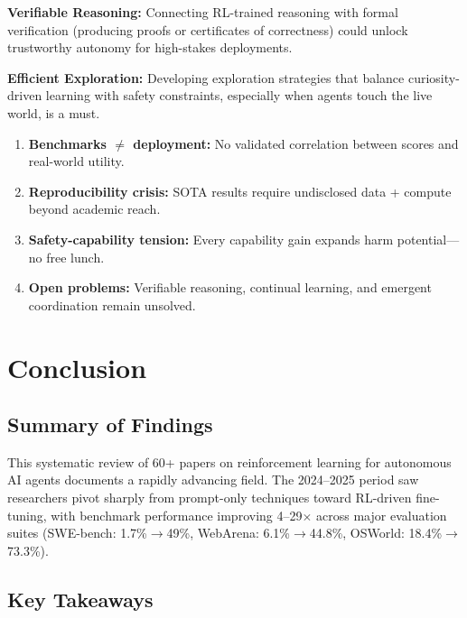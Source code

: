 \documentclass[12pt,a4paper]{report}
\theoremstyle{definition}
\begin{document}
\textbf{Verifiable Reasoning:} Connecting RL-trained reasoning with formal verification (producing proofs or certificates of correctness) could unlock trustworthy autonomy for high-stakes deployments.

\textbf{Efficient Exploration:} Developing exploration strategies that balance curiosity-driven learning with safety constraints, especially when agents touch the live world, is a must.

\begin{tcolorbox}[colback=red!5!white, colframe=red!60!black, title=\textbf{Chapter 6 Key Takeaways}]
\begin{enumerate}
    \item \textbf{Benchmarks $\neq$ deployment:} No validated correlation between scores and real-world utility.
    \item \textbf{Reproducibility crisis:} SOTA results require undisclosed data + compute beyond academic reach.
    \item \textbf{Safety-capability tension:} Every capability gain expands harm potential---no free lunch.
    \item \textbf{Open problems:} Verifiable reasoning, continual learning, and emergent coordination remain unsolved.
\end{enumerate}
\end{tcolorbox}



\chapter{Conclusion}
\label{ch:conclusion}

\section*{Summary of Findings}
This systematic review of 60+ papers on reinforcement learning for autonomous AI agents documents a rapidly advancing field. The 2024--2025 period saw researchers pivot sharply from prompt-only techniques toward RL-driven fine-tuning, with benchmark performance improving 4--29$\times$ across major evaluation suites (SWE-bench: 1.7\%$\rightarrow$49\%, WebArena: 6.1\%$\rightarrow$44.8\%, OSWorld: 18.4\%$\rightarrow$73.3\%).

\section*{Key Takeaways}
\end{document}
